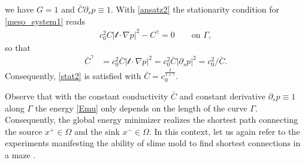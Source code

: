 \documentclass{article}
\numberwithin{equation}{section}
\begin{document}
we have $G=1$ and $\bar C \partial_s p \equiv 1$.
With \eqref{ansatz2} the stationarity condition for \eqref{meso_system1} reads
\begin{align}   \label{stat2}
   c_0^2 C|\mathcal{t}\cdot\nabla p|^2 - C^\gamma = 0 \qquad\mbox{on }\Gamma,
\end{align}
so that
\begin{align*}
   \bar{C}^\gamma &= c_0^2 \bar{C} | \mathcal{t}\cdot \nabla p|^2 = c_0^2 \bar{C} |\partial_s p|^2 = c_0^2/\bar C. %
\end{align*}
Consequently, \eqref{stat2} is satisfied with $\bar{C}=c_0^{\frac{2}{1+\gamma}}$.

Observe that with the constant conductivity $\bar{C}$ and constant derivative $\partial_s p \equiv 1$ along $\Gamma$
the energy \eqref{Emu} only depends on the length of the curve $\Gamma$.
Consequently, the global energy minimizer realizes the shortest path connecting
the source $x^+\in\Omega$ and the sink $x^-\in\Omega$.
In this context, let us again refer to the experiments manifesting the ability of slime mold to find shortest connections in a maze \cite{facca2018towards, Tero}.



\end{document}

